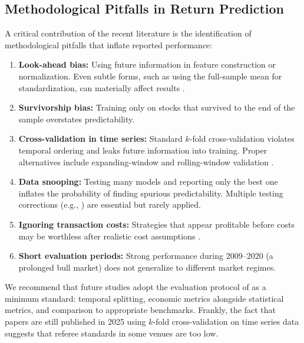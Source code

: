 \subsection{Methodological Pitfalls in Return Prediction}

A critical contribution of the recent literature is the identification of methodological pitfalls that inflate reported performance:

\begin{enumerate}[leftmargin=*]
    \item \textbf{Look-ahead bias:} Using future information in feature construction or normalization. Even subtle forms, such as using the full-sample mean for standardization, can materially affect results \citep{DePrado2018}.

    \item \textbf{Survivorship bias:} Training only on stocks that survived to the end of the sample overstates predictability.

    \item \textbf{Cross-validation in time series:} Standard $k$-fold cross-validation violates temporal ordering and leaks future information into training. Proper alternatives include expanding-window and rolling-window validation \citep{Gu2020}.

    \item \textbf{Data snooping:} Testing many models and reporting only the best one inflates the probability of finding spurious predictability. Multiple testing corrections (e.g., \citealt{Harvey2016}) are essential but rarely applied.

    \item \textbf{Ignoring transaction costs:} Strategies that appear profitable before costs may be worthless after realistic cost assumptions \citep{NovyMarx2015alt, Tobek2021}.

    \item \textbf{Short evaluation periods:} Strong performance during 2009--2020 (a prolonged bull market) does not generalize to different market regimes.
\end{enumerate}

We recommend that future studies adopt the evaluation protocol of \citet{Gu2020} as a minimum standard: temporal splitting, economic metrics alongside statistical metrics, and comparison to appropriate benchmarks. Frankly, the fact that papers are still published in 2025 using $k$-fold cross-validation on time series data suggests that referee standards in some venues are too low.
